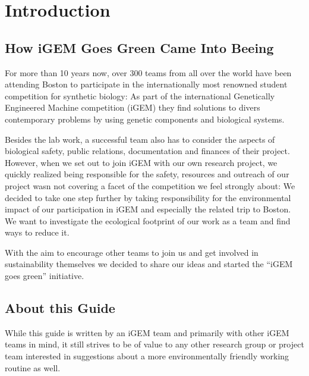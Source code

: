 
\chapter*{Introduction}
\section*{How iGEM Goes Green Came Into Beeing}
For more than 10 years now, over 300 teams from all over the world have been attending Boston to participate in the internationally most renowned student competition for synthetic biology: As part of the international Genetically Engineered Machine competition (iGEM) they find solutions to divers contemporary problems by using genetic components and biological systems.

Besides the lab work, a successful team also has to consider the aspects of biological safety, public relations, documentation and finances of their project. However, when we set out to join iGEM with our own research project, we quickly realized being responsible for the safety, resources and outreach of our project wasn not covering a facet of the competition we feel strongly about: We decided to take one step further by taking responsibility for the environmental impact of our participation in iGEM and especially the related trip to Boston. We want to investigate the ecological footprint of our work as a team and find ways to reduce it. 

With the aim to encourage other teams to join us and get involved in sustainability themselves we decided to share our ideas and started the “iGEM goes green” initiative.

\section*{About this Guide}
While this guide is written by an iGEM team and primarily with other iGEM teams in mind, it still strives to be of value to any other research group or project team interested in suggestions about a more environmentally friendly working routine as well.

